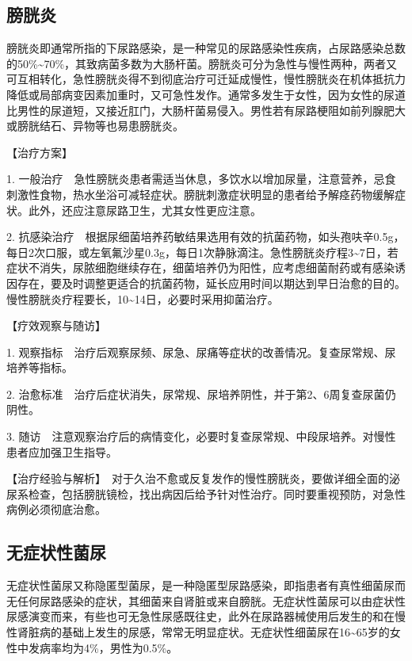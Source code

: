 \subsection{膀胱炎}

膀胱炎即通常所指的下尿路感染，是一种常见的尿路感染性疾病，占尿路感染总数的50\%\textasciitilde{}70\%，其致病菌多数为大肠杆菌。膀胱炎可分为急性与慢性两种，两者又可互相转化，急性膀胱炎得不到彻底治疗可迁延成慢性，慢性膀胱炎在机体抵抗力降低或局部病变因素加重时，又可急性发作。通常多发生于女性，因为女性的尿道比男性的尿道短，又接近肛门，大肠杆菌易侵入。男性若有尿路梗阻如前列腺肥大或膀胱结石、异物等也易患膀胱炎。

【治疗方案】

1.
一般治疗　急性膀胱炎患者需适当休息，多饮水以增加尿量，注意营养，忌食刺激性食物，热水坐浴可减轻症状。膀胱刺激症状明显的患者给予解痉药物缓解症状。此外，还应注意尿路卫生，尤其女性更应注意。

2.
抗感染治疗　根据尿细菌培养药敏结果选用有效的抗菌药物，如头孢呋辛0.5g，每日2次口服，或左氧氟沙星0.3g，每日1次静脉滴注。急性膀胱炎疗程3\textasciitilde{}7日，若症状不消失，尿脓细胞继续存在，细菌培养仍为阳性，应考虑细菌耐药或有感染诱因存在，要及时调整更适合的抗菌药物，延长应用时间以期达到早日治愈的目的。慢性膀胱炎疗程要长，10\textasciitilde{}14日，必要时采用抑菌治疗。

【疗效观察与随访】

1.
观察指标　治疗后观察尿频、尿急、尿痛等症状的改善情况。复查尿常规、尿培养等指标。

2.
治愈标准　治疗后症状消失，尿常规、尿培养阴性，并于第2、6周复查尿菌仍阴性。

3.
随访　注意观察治疗后的病情变化，必要时复查尿常规、中段尿培养。对慢性患者应加强卫生指导。

【治疗经验与解析】　对于久治不愈或反复发作的慢性膀胱炎，要做详细全面的泌尿系检查，包括膀胱镜检，找出病因后给予针对性治疗。同时要重视预防，对急性病例必须彻底治愈。

\subsection{无症状性菌尿}

无症状性菌尿又称隐匿型菌尿，是一种隐匿型尿路感染，即指患者有真性细菌尿而无任何尿路感染的症状，其细菌来自肾脏或来自膀胱。无症状性菌尿可以由症状性尿感演变而来，有些也可无急性尿感既往史，此外在尿路器械使用后发生的和在慢性肾脏病的基础上发生的尿感，常常无明显症状。无症状性细菌尿在16\textasciitilde{}65岁的女性中发病率均为4\%，男性为0.5\%。

